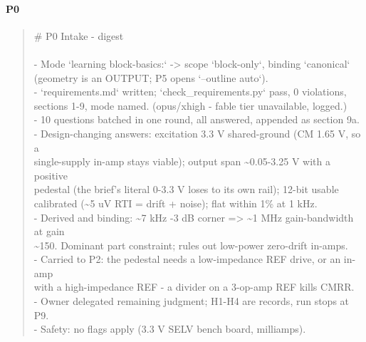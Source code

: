 \documentclass[11pt,a4paper]{article}
\begin{document}
\paragraph*{P0}
\begin{quote}\small\ttfamily\raggedright
\# P0 Intake - digest\\
~\\
- Mode `learning block-basics:` -\textgreater{} scope `block-only`, binding `canonical`\\
  (geometry is an OUTPUT; P5 opens `--outline auto`).\\
- `requirements.md` written; `check\_requirements.py` pass, 0 violations,\\
  sections 1-9, mode named. (opus/xhigh - fable tier unavailable, logged.)\\
- 10 questions batched in one round, all answered, appended as section 9a.\\
- Design-changing answers: excitation 3.3 V shared-ground (CM 1.65 V, so a\\
  single-supply in-amp stays viable); output span \textasciitilde{}0.05-3.25 V with a positive\\
  pedestal (the brief's literal 0-3.3 V loses to its own rail); 12-bit usable\\
  calibrated (\textasciitilde{}5 uV RTI = drift + noise); flat within 1\% at 1 kHz.\\
- Derived and binding: \textasciitilde{}7 kHz -3 dB corner =\textgreater{} \textasciitilde{}1 MHz gain-bandwidth at gain\\
  \textasciitilde{}150. Dominant part constraint; rules out low-power zero-drift in-amps.\\
- Carried to P2: the pedestal needs a low-impedance REF drive, or an in-amp\\
  with a high-impedance REF - a divider on a 3-op-amp REF kills CMRR.\\
- Owner delegated remaining judgment; H1-H4 are records, run stops at P9.\\
- Safety: no flags apply (3.3 V SELV bench board, milliamps).
\end{quote}
\end{document}
